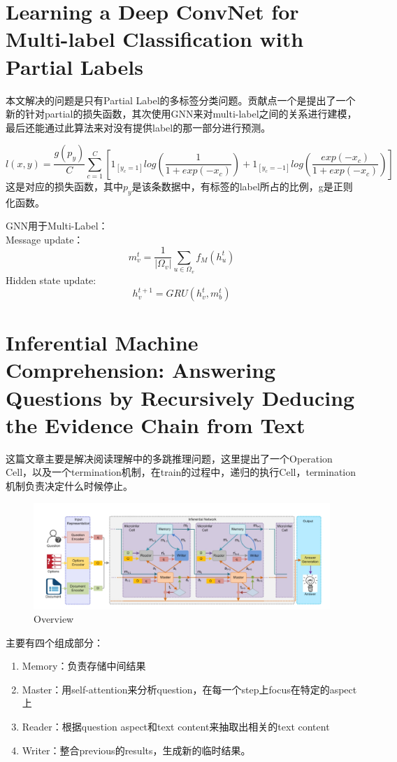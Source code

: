 \documentclass[a4paper,UTF8]{article}
\numberwithin{equation}{section}
\begin{document}
\newpage
\section{Learning a Deep ConvNet for Multi-label Classification with Partial Labels}
本文解决的问题是只有Partial Label的多标签分类问题。贡献点一个是提出了一个新的针对partial的损失函数，其次使用GNN来对multi-label之间的关系进行建模，最后还能通过此算法来对没有提供label的那一部分进行预测。

$$l(x,y)=\frac{g(p_y)}{C} \sum_{c=1}^{C}[1_{[y_c =1 ]}log(\frac{1}{1+exp(-x_c)})+1_{[y_c =-1 ]}log(\frac{exp(-x_c)}{1+exp(-x_c)})] $$
这是对应的损失函数，其中$p_y$是该条数据中，有标签的label所占的比例，g是正则化函数。

GNN用于Multi-Label：\\
Message update：\\
$$m_v^t = \frac{1}{|\Omega_v|}\sum_{u \in \Omega_v}f_{M}(h_u^t)$$
Hidden state update:\\   
$$ h_v^{t+1}=GRU(h_v^t,m_b^t) $$


\newpage
\section{Inferential Machine Comprehension: Answering Questions by Recursively Deducing the Evidence Chain from Text}
这篇文章主要是解决阅读理解中的多跳推理问题，这里提出了一个Operation Cell，以及一个termination机制，在train的过程中，递归的执行Cell，termination机制负责决定什么时候停止。
\begin{figure}[H]
	\centering
	\includegraphics[width=\textwidth]{7-1.png}
	\caption{Overview}
\end{figure}
主要有四个组成部分：
\begin{enumerate}
	\item Memory：负责存储中间结果
	\item Master：用self-attention来分析question，在每一个step上focus在特定的aspect上
	\item Reader：根据question aspect和text content来抽取出相关的text content
	\item Writer：整合previous的results，生成新的临时结果。
\end{enumerate}
\end{document}
